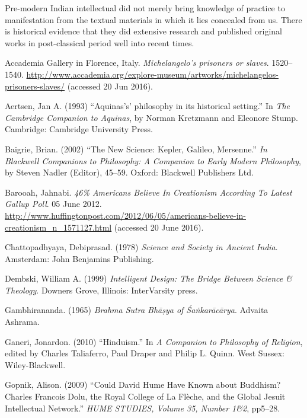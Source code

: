 Pre-modern Indian intellectual did not merely bring knowledge of practice to manifestation from the textual materials in which it lies concealed from us. There is historical evidence that they did extensive research and published original works in post-classical period well into recent times.

\begin{thebibliography}{99}
\itemsep=2pt
Accademia Gallery in Florence, Italy. {\sl Michelangelo's prisoners or slaves}. 1520--1540. \url{http://www.accademia.org/explore-museum/artworks/michelangelos-prisoners-slaves/} (accessed 20 Jun 2016).

Aertsen, Jan A. (1993) ``Aquinas's' philosophy in its historical setting.'' In {\sl The Cambridge Companion to Aquinas}, by Norman Kretzmann and Eleonore Stump. Cambridge: Cambridge University Press.

Baigrie, Brian. (2002) ``The New Science: Kepler, Galileo, Mersenne.'' {\sl In Blackwell Companions to Philosophy: A Companion to Early Modern Philosophy}, by Steven Nadler (Editor), 45--59. Oxford: Blackwell Publishers Ltd.

Barooah, Jahnabi. {\sl 46\% Americans Believe In Creationism According To Latest Gallup Poll}. 05 June 2012. \url{http://www.huffingtonpost.com/2012/06/05/americans-believe-in-creationism_n_1571127.html} (accessed 20 June 2016).

Chattopadhyaya, Debiprasad. (1978) {\sl Science and Society in Ancient India}. Amsterdam: John Benjamins Publishing.

Dembski, William A. (1999) {\sl Intelligent Design: The Bridge Between Science \& Theology}. Downers Grove, Illinois: InterVarsity press.

Gambhirananda. (1965) {\sl Brahma Sutra Bhāṣya of Śaṅkarācārya}. Advaita Ashrama.

Ganeri, Jonardon. (2010) ``Hinduism.'' In {\sl A Companion to Philosophy of Religion}, edited by Charles Taliaferro, Paul Draper and Philip L. Quinn. West Sussex: Wiley-Blackwell.

Gopnik, Alison. (2009) ``Could David Hume Have Known about Buddhism? Charles Francois Dolu, the Royal College of La Flèche, and the Global Jesuit Intellectual Network.'' {\sl HUME STUDIES, Volume 35, Number 1\&2}, pp5--28.


\end{thebibliography}
